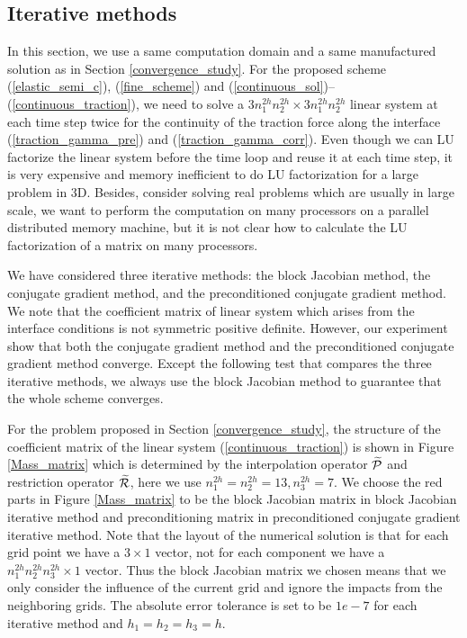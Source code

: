 \subsection{Iterative methods}\label{iterative_section}
In this section, we use a same computation domain and a same manufactured solution as in Section \ref{convergence_study}. For the proposed scheme (\ref{elastic_semi_c}), (\ref{fine_scheme}) and (\ref{continuous_sol})--(\ref{continuous_traction}), we need to solve a $3n_1^{2h}n_2^{2h}\times 3n_1^{2h}n_2^{2h}$ linear system at each time step twice for the continuity of the traction force along the interface (\ref{traction_gamma_pre}) and (\ref{traction_gamma_corr}). Even though we can LU factorize the linear system before the time loop and reuse it at each time step, it is very expensive and memory inefficient to do LU factorization for a large problem in $3$D. Besides, consider solving real problems which are usually in large scale, we want to perform the computation on many processors on a parallel distributed memory machine, but it is not clear how to calculate the LU factorization of a matrix on many processors. 

We have considered three iterative methods: the block Jacobian method, the conjugate gradient method, and the preconditioned conjugate gradient method. We note that the coefficient matrix of linear system which arises from the interface conditions is not symmetric positive definite. However, our experiment show that both the conjugate gradient method and the preconditioned conjugate gradient method converge. Except the following test that compares the three iterative methods, we always use the block Jacobian method to guarantee that the whole scheme converges. 

For the problem proposed in Section \ref{convergence_study}, the structure of the coefficient matrix of the linear system (\ref{continuous_traction}) is shown in Figure \ref{Mass_matrix} which is determined by the interpolation operator $\widetilde{\mathcal{P}}$ and restriction operator $\widetilde{\mathcal{R}}$, here we use $n_1^{2h} = n_2^{2h}=13, n_3^{2h} = 7$. We choose the red parts in Figure \ref{Mass_matrix} to be the block Jacobian matrix in block Jacobian iterative method and preconditioning matrix in preconditioned conjugate gradient iterative method. Note that the layout of the numerical solution is that for each grid point we have a $3\times1$ vector, not for each component we have a $n_1^{2h}n_2^{2h}n_3^{2h}\times1$ vector.  Thus the block Jacobian matrix we chosen means that we only consider the influence of the current grid and ignore the impacts from the neighboring grids. The absolute error tolerance is set to be $1e-7$ for each iterative method and $h_1 = h_2 = h_3 = h$.

